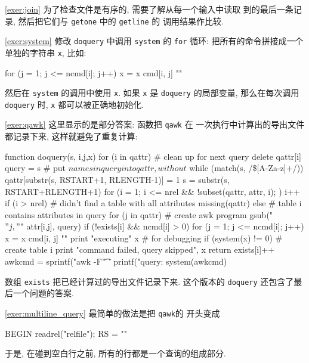 \myexer\ref{exer:join} 为了检查文件是有序的, 需要了解从每一个输入中读取
到的最后一条记录, 然后把它们与 \texttt{getone} 中的 \texttt{getline} 的
调用结果作比较.

\myexer\ref{exer:system} 修改 \texttt{doquery} 中调用 \texttt{system}
的 \texttt{for} 循环: 把所有的命令拼接成一个单独的字符串 \texttt{x},
比如:
\begin{awkcode}
    for (j = 1; j <= ncmd[i]; j++) x = x cmd[i, j] "\n"
\end{awkcode}
然后在 \texttt{system} 的调用中使用 \texttt{x}. 如果 \texttt{x} 是 
\texttt{doquery} 的局部变量, 那么在每次调用 \texttt{doquery} 时, 
\texttt{x} 都可以被正确地初始化.

\myexer\ref{exer:qawk} 这里显示的是部分答案: 函数把 \texttt{qawk} 在
一次执行中计算出的导出文件都记录下来, 这样就避免了重复计算:
\begin{awkcode}
    function doquery(s,   i,j,x) {
        for (i in qattr)  # clean up for next query
            delete qattr[i]
        query = s    # put $names in query into qattr, without $
        while (match(s, /\$[A-Za-z]+/)) {
            qattr[substr(s, RSTART+1, RLENGTH-1)] = 1
            s = substr(s, RSTART+RLENGTH+1)
        }
        for (i = 1; i <= nrel && !subset(qattr, attr, i); ) 
            i++
        if (i > nrel)     # didn't find a table with all attributes
            missing(qattr)
        else {            # table i contains attributes in query
            for (j in qattr)   # create awk program
                gsub("\\$" j, "$" attr[i,j], query)
            if (!exists[i] && ncmd[i] > 0) {
                for (j = 1; j <= ncmd[i]; j++)
                    x = x cmd[i, j] "\n"
                print "executing\n" x  # for debugging
                if (system(x) != 0) { # create table i
                        print "command failed, query skipped\n", x
                        return
                   }
                exists[i]++
            }
            awkcmd = sprintf("awk -F'\t' '%
            printf("query: %
            system(awkcmd)
        }
    }
\end{awkcode}
数组 \texttt{exists} 把已经计算过的导出文件记录下来. 这个版本的
\texttt{doquery} 还包含了最后一个问题的答案.

\myexer\ref{exer:multiline_query} 最简单的做法是把 \texttt{qawk}的
开头变成 
\begin{awkcode}
    BEGIN { readrel("relfile"); RS = "" }
\end{awkcode}
于是, 在碰到空白行之前, 所有的行都是一个查询的组成部分. 
